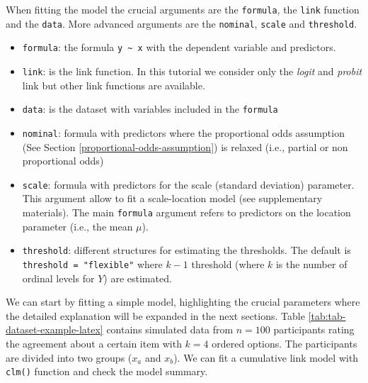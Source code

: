 \documentclass[
  man,floatsintext]{apa6}
\providecommand{\tightlist}{%
  \setlength{\itemsep}{0pt}\setlength{\parskip}{0pt}}
\begin{document}
When fitting the model the crucial arguments are the \texttt{formula}, the \texttt{link} function and the \texttt{data}. More advanced arguments are the \texttt{nominal}, \texttt{scale} and \texttt{threshold}.

\begin{itemize}
\tightlist
\item
  \texttt{formula}: the formula \texttt{y\ \textasciitilde{}\ x} with the dependent variable and predictors.
\item
  \texttt{link}: is the link function. In this tutorial we consider only the \emph{logit} and \emph{probit} link but other link functions are available.
\item
  \texttt{data}: is the dataset with variables included in the \texttt{formula}
\item
  \texttt{nominal}: formula with predictors where the proportional odds assumption (See Section \ref{proportional-odds-assumption}) is relaxed (i.e., partial or non proportional odds)
\item
  \texttt{scale}: formula with predictors for the scale (standard deviation) parameter. This argument allow to fit a scale-location model (see supplementary materials). The main \texttt{formula} argument refers to predictors on the location parameter (i.e., the mean \(\mu\)).
\item
  \texttt{threshold}: different structures for estimating the thresholds. The default is \texttt{threshold\ =\ "flexible"} where \(k - 1\) threshold (where \(k\) is the number of ordinal levels for \(Y\)) are estimated.
\end{itemize}

We can start by fitting a simple model, highlighting the crucial parameters where the detailed explanation will be expanded in the next sections. Table \ref{tab:tab-dataset-example-latex} contains simulated data from \(n = 100\) participants rating the agreement about a certain item with \(k = 4\) ordered options. The participants are divided into two groups (\(x_a\) and \(x_b\)). We can fit a cumulative link model with \texttt{clm()} function and check the model summary.

\scriptsize

\normalsize

\scriptsize
\end{document}
